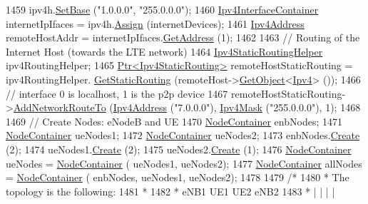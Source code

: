\begin{DoxyCode}
1459   ipv4h.\hyperlink{classns3_1_1Ipv4AddressHelper_acf7b16dd25bac67e00f5e25f90a9a035}{SetBase} (\textcolor{stringliteral}{"1.0.0.0"}, \textcolor{stringliteral}{"255.0.0.0"});
1460   \hyperlink{classns3_1_1Ipv4InterfaceContainer}{Ipv4InterfaceContainer} internetIpIfaces = ipv4h.\hyperlink{classns3_1_1Ipv4AddressHelper_af8e7f4a1a7e74c00014a1eac445a27af}{Assign} (internetDevices);
1461   \hyperlink{classns3_1_1Ipv4Address}{Ipv4Address} remoteHostAddr = internetIpIfaces.\hyperlink{classns3_1_1Ipv4InterfaceContainer_ae63208dcd222be986822937ee4aa828c}{GetAddress} (1);
1462 
1463   \textcolor{comment}{// Routing of the Internet Host (towards the LTE network)}
1464   \hyperlink{classns3_1_1Ipv4StaticRoutingHelper}{Ipv4StaticRoutingHelper} ipv4RoutingHelper;
1465   \hyperlink{classns3_1_1Ptr}{Ptr<Ipv4StaticRouting>} remoteHostStaticRouting = ipv4RoutingHelper.
      \hyperlink{classns3_1_1Ipv4StaticRoutingHelper_a731206e50d305695dac7fb2ef963a4bb}{GetStaticRouting} (remoteHost->\hyperlink{classns3_1_1Object_a13e18c00017096c8381eb651d5bd0783}{GetObject}<\hyperlink{classns3_1_1Ipv4}{Ipv4}> ());
1466   \textcolor{comment}{// interface 0 is localhost, 1 is the p2p device}
1467   remoteHostStaticRouting->\hyperlink{classns3_1_1Ipv4StaticRouting_a8bf5eaa7ba49fe33c78c70d5560b6c39}{AddNetworkRouteTo} (\hyperlink{classns3_1_1Ipv4Address}{Ipv4Address} (\textcolor{stringliteral}{"7.0.0.0"}), 
      \hyperlink{classns3_1_1Ipv4Mask}{Ipv4Mask} (\textcolor{stringliteral}{"255.0.0.0"}), 1);
1468 
1469   \textcolor{comment}{// Create Nodes: eNodeB and UE}
1470   \hyperlink{classns3_1_1NodeContainer}{NodeContainer} enbNodes;
1471   \hyperlink{classns3_1_1NodeContainer}{NodeContainer} ueNodes1;
1472   \hyperlink{classns3_1_1NodeContainer}{NodeContainer} ueNodes2;
1473   enbNodes.\hyperlink{classns3_1_1NodeContainer_a787f059e2813e8b951cc6914d11dfe69}{Create} (2);
1474   ueNodes1.\hyperlink{classns3_1_1NodeContainer_a787f059e2813e8b951cc6914d11dfe69}{Create} (2);
1475   ueNodes2.\hyperlink{classns3_1_1NodeContainer_a787f059e2813e8b951cc6914d11dfe69}{Create} (1);
1476   \hyperlink{classns3_1_1NodeContainer}{NodeContainer} ueNodes = \hyperlink{classns3_1_1NodeContainer}{NodeContainer} ( ueNodes1, ueNodes2);
1477   \hyperlink{classns3_1_1NodeContainer}{NodeContainer} allNodes = \hyperlink{classns3_1_1NodeContainer}{NodeContainer} ( enbNodes, ueNodes1, ueNodes2);
1478 
1479   \textcolor{comment}{/*}
1480 \textcolor{comment}{   * The topology is the following:}
1481 \textcolor{comment}{   *}
1482 \textcolor{comment}{   *  eNB1            UE1                        UE2            eNB2}
1483 \textcolor{comment}{   *    |              |                          |              |}

\end{DoxyCode}
